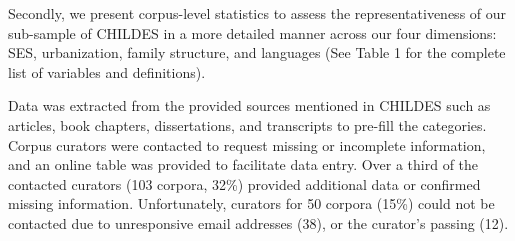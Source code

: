 \documentclass[
  man,floatsintext]{apa6}
\begin{document}
Secondly, we present corpus-level statistics to assess the representativeness of our sub-sample of CHILDES in a more detailed manner across our four dimensions: SES, urbanization, family structure, and languages (See Table 1 for the complete list of variables and definitions).

Data was extracted from the provided sources mentioned in CHILDES such as articles, book chapters, dissertations, and transcripts to pre-fill the categories. Corpus curators were contacted to request missing or incomplete information, and an online table was provided to facilitate data entry. Over a third of the contacted curators (103 corpora, 32\%) provided additional data or confirmed missing information. Unfortunately, curators for 50 corpora (15\%) could not be contacted due to unresponsive email addresses (38), or the curator's passing (12).
\end{document}
